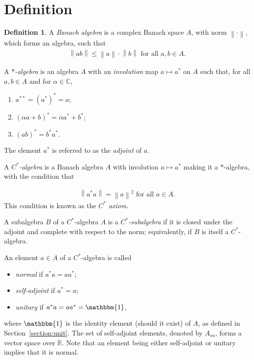 \documentclass[11pt,a4paper]{report}
\theoremstyle{plain}
\theoremstyle{definition}
\newtheorem*{defn}{Definition}
\newcommand{\1}{\mathbbm{1}}
\newcommand{\C}{\mathbb{C}}
\newcommand{\R}{\mathbb{R}}
\begin{document}
\section{Definition}
\begin{defn}
	A \emph{Banach algebra} is a complex Banach space $A$, with norm 
	$\left\|\cdot\right\|$, which forms an algebra, such that 
	\begin{align*}
		\left\|ab\right\| \leq 
				\left\|a\right\| \cdot \left\|b\right\| \mbox{ for all } a,b \in A.
	\end{align*}
	
	A \emph{$\ast$-algebra} is an algebra $A$ with an \emph{involution} map 
	$a \mapsto a^\ast$ on $A$ such that, for all $a,b \in A$ and for $\alpha \in \C$,
	\begin{enumerate}
		\item $a^{\ast\ast} = (a^\ast)^\ast = a$;
		\item $(\alpha a+b)^\ast = \overline{\alpha} a^\ast + b^\ast$;
		\item $(ab)^\ast = b^\ast a^\ast$.
	\end{enumerate}
	The element $a^\ast$ is referred to as the \emph{adjoint} of $a$. 
	
	A \emph{$C^\ast$-algebra} is a Banach algebra $A$ with involution $a \mapsto 
	a^\ast$ making it a $\ast$-algebra, with the condition that

	\begin{align*}
		\left\|a ^\ast a\right\| = \left\|a\right\|^2 \mbox{ for all } a \in A.
	\end{align*}
	This condition is known as the \emph{$C^\ast$ axiom}.
	
	A subalgebra $B$ of a $C^\ast$-algebra $A$ is a \emph{$C^\ast$-subalgebra} if it 
	is closed under the adjoint and complete with respect to the norm; equivalently, 
	if $B$ is itself a $C^\ast$-algebra.

	
	An element $a\in A$ of a $C^\ast$-algebra is called
	\begin{itemize}
		\item	\emph{normal} if $a^\ast a=aa^\ast$;
		\item 	\emph{self-adjoint} if $a^\ast=a$;
		\item 	\emph{unitary} if $a^\ast a = aa^\ast =\1$,
	\end{itemize}
	where $\1$ is the identity element (should it exist) of $A$, as defined in 
	Section~\ref{section:unit}. 
	The set of self-adjoint elements, denoted by $A_{sa}$, forms a vector space 
	over $\R$. Note that an element being either self-adjoint or unitary implies 
	that it is normal.
\end{defn}
\end{document}
